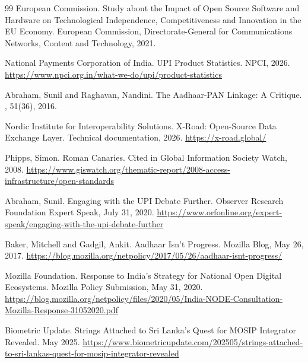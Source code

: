 \documentclass{article}
\begin{document}
\begin{thebibliography}{99}
European Commission.
\newblock Study about the Impact of Open Source Software and Hardware on Technological Independence, Competitiveness and Innovation in the EU Economy.
\newblock European Commission, Directorate-General for Communications Networks, Content and Technology, 2021.

National Payments Corporation of India.
\newblock UPI Product Statistics.
\newblock NPCI, 2026.
\newblock \url{https://www.npci.org.in/what-we-do/upi/product-statistics}

Abraham, Sunil and Raghavan, Nandini.
\newblock The Aadhaar-PAN Linkage: A Critique.
, 51(36), 2016.

Nordic Institute for Interoperability Solutions.
\newblock X-Road: Open-Source Data Exchange Layer.
\newblock Technical documentation, 2026.
\newblock \url{https://x-road.global/}

Phipps, Simon.
\newblock Roman Canaries.
\newblock Cited in Global Information Society Watch, 2008.
\newblock \url{https://www.giswatch.org/thematic-report/2008-access-infrastructure/open-standards}

Abraham, Sunil.
\newblock Engaging with the UPI Debate Further.
\newblock Observer Research Foundation Expert Speak, July 31, 2020.
\newblock \url{https://www.orfonline.org/expert-speak/engaging-with-the-upi-debate-further}

Baker, Mitchell and Gadgil, Ankit.
\newblock Aadhaar Isn't Progress.
\newblock Mozilla Blog, May 26, 2017.
\newblock \url{https://blog.mozilla.org/netpolicy/2017/05/26/aadhaar-isnt-progress/}

Mozilla Foundation.
\newblock Response to India's Strategy for National Open Digital Ecosystems.
\newblock Mozilla Policy Submission, May 31, 2020.
\newblock \url{https://blog.mozilla.org/netpolicy/files/2020/05/India-NODE-Consultation-Mozilla-Response-31052020.pdf}

Biometric Update.
\newblock Strings Attached to Sri Lanka's Quest for MOSIP Integrator Revealed.
\newblock May 2025.
\newblock \url{https://www.biometricupdate.com/202505/strings-attached-to-sri-lankas-quest-for-mosip-integrator-revealed}

\end{thebibliography}
\end{document}
